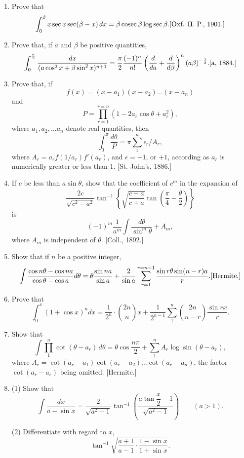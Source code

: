 \documentclass[11pt, a4paper]{article}
\newcommand{\source}[1]{\hfill\textnormal{[#1]}}
\begin{document}
\begin{enumerate}[leftmargin=2em]
\item Prove that
\[
\int_0^\beta x\sec x\sec(\beta-x)\,dx = \beta\,\text{cosec}\,\beta\log\sec\beta. \source{Oxf. II. P., 1901.}
\]

\item Prove that, if $a$ and $\beta$ be positive quantities,
\[
\int_0^{\frac\pi2} \dfrac{dx}{(a\cos^2x+\beta\sin^2x)^{n+1}} = \dfrac\pi2\dfrac{(-1)^n}{n!}\left(\dfrac{d}{da}+\dfrac{d}{d\beta}\right)^n(a\beta)^{-\frac12}. \source{a, 1884.}
\]

\item Prove that, if
\[
f(x)=(x-a_1)(x-a_2)\dots(x-a_n)
\]
and
\[
P=\prod_{r=1}^{r=n}(1-2a_r\cos\theta+a_r^2),
\]
where $a_1,a_2,\dots a_n$ denote real quantities, then
\[
\int_0^\pi \dfrac{d\theta}{P} = \pi\sum_1^n \epsilon_r/A_r,
\]
where $A_r=a_rf(1/a_r)f'(a_r)$, and $\epsilon=-1$, or $+1$, according as $a_r$ is numerically greater or less than $1$. \source{St. John's, 1886.}

\item If $c$ be less than $a\sin\theta$, show that the coefficient of $c^m$ in the expansion of
\[
\dfrac{2c}{\sqrt{c^2-a^2}}\tan^{-1}\left\{\sqrt{\dfrac{c-a}{c+a}}\tan\left(\dfrac\pi4-\dfrac\theta2\right)\right\}
\]
is
\[
(-1)^m\dfrac{1}{a^m}\int \dfrac{d\theta}{\sin^m\theta}+A_m,
\]
where $A_m$ is independent of $\theta$. \source{Coll., 1892.}

\item Show that if $n$ be a positive integer,
\[
\int \dfrac{\cos n\theta-\cos na}{\cos\theta-\cos a}d\theta = \theta\dfrac{\sin na}{\sin a}+\dfrac{2}{\sin a}\sum_{r=1}^{r=n-1}\dfrac{\sin r\theta\sin(n-r)a}{r}. \source{Hermite.}
\]

\item Prove that
\[
\int_0^x (1+\cos x)^n dx = \dfrac{1}{2^n}\cdot\binom{2n}{n}x+\dfrac{1}{2^{n-1}}\sum_1^n \binom{2n}{n-r}\dfrac{\sin rx}{r}.
\]

\item Show that
\[
\int \prod_1^n \cot(\theta-a_r)\,d\theta = \theta\cos\dfrac{n\pi}{2}+\sum_1^n A_r\log\sin(\theta-a_r),
\]
where $A_r=\cot(a_r-a_1)\cot(a_r-a_2)\dots\cot(a_r-a_n)$, the factor $\cot(a_r-a_r)$ being omitted. \source{Hermite.}

\item (1) Show that
\[
\int \dfrac{dx}{a-\sin x} = \dfrac{2}{\sqrt{a^2-1}}\tan^{-1}\left(\dfrac{a\tan\dfrac x2-1}{\sqrt{a^2-1}}\right) \qquad (a>1).
\]

(2) Differentiate with regard to $x$,
\[
\tan^{-1}\sqrt{\dfrac{a+1}{a-1}\cdot\dfrac{1-\sin x}{1+\sin x}}.
\]


\end{enumerate}
\end{document}
